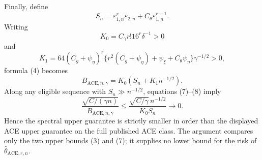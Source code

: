 Finally, define
\[
 S_n=\varepsilon_{1,n}^r\varepsilon_{2,n}
     +C_{\theta}\varepsilon_{1,n}^{r+1}.
\]
Writing
\[
 K_0=C_{\gamma}r!16^r\delta^{-1}>0
\]
and
\[
 K_1=64(C_g+\psi_{\eta})^r
 \{r^2(C_g+\psi_{\eta})+\psi_{\xi}
      +C_{\theta}\psi_{\eta}\}\gamma^{-1/2}>0,
\]
formula (4) becomes
\[
 B_{\mathrm{ACE},n,\gamma}=K_0(S_n+K_1n^{-1/2}).
 \tag{8}
\]
Along any eligible sequence with \(S_n\gg n^{-1/2}\), equations (7)--(8) imply
\[
 \frac{\sqrt{C/(\gamma n)}}{B_{\mathrm{ACE},n,\gamma}}
 \le
 \frac{\sqrt{C/\gamma}\,n^{-1/2}}{K_0S_n}
 \longrightarrow0.
\]
Hence the spectral upper guarantee is strictly smaller in order than the displayed ACE upper guarantee on the full published ACE class.  The argument compares only the two upper bounds (3) and (7); it supplies no lower bound for the risk of \(\widehat\theta_{\mathrm{ACE},r,n}\).